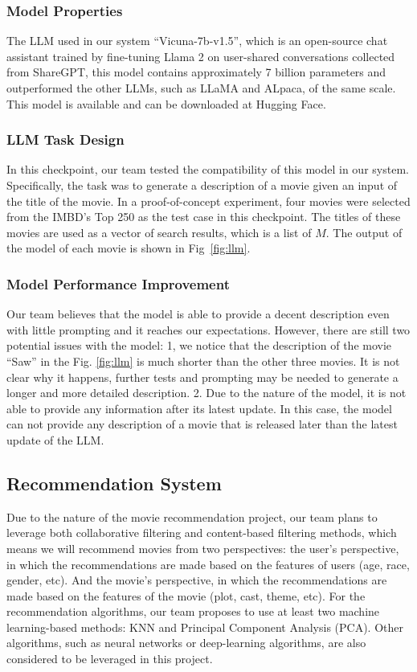 \documentclass[journal]{IEEEtran}
\theoremstyle{mydefstyle}
\begin{document}
\subsubsection{Model Properties}
The LLM used in our system “Vicuna-7b-v1.5”, which is an open-source chat assistant trained by fine-tuning Llama 2 on user-shared conversations collected from ShareGPT, this model contains approximately 7 billion parameters and outperformed the other LLMs, such as LLaMA and ALpaca, of the same scale\cite{zheng2023judging}. This model is available and can be downloaded at Hugging Face.  

\subsubsection{LLM Task Design}
In this checkpoint, our team tested the compatibility of this model in our system. Specifically, the task was to generate a description of a movie given an input of the title of the movie. In a proof-of-concept experiment, four movies were selected from the IMBD's Top 250 as the test case in this checkpoint\cite{IMDbhot250}. The titles of these movies are used as a vector of search results, which is a list of \(M\). The output of the model of each movie is shown in Fig~\ref{fig:llm}. 


\subsubsection{Model Performance Improvement}
Our team believes that the model is able to provide a decent description even with little prompting and it reaches our expectations. However, there are still two potential issues with the model: 1, we notice that the description of the movie “Saw” in the Fig. \ref{fig:llm} is much shorter than the other three movies. It is not clear why it happens, further tests and prompting may be needed to generate a longer and more detailed description. 2. Due to the nature of the model, it is not able to provide any information after its latest update. In this case, the model can not provide any description of a movie that is released later than the latest update of the LLM. 

\subsection{Recommendation System}
Due to the nature of the movie recommendation project,  our team plans to leverage both collaborative filtering and content-based filtering methods, which means we will recommend movies from two perspectives: the user's perspective, in which the recommendations are made based on the features of users (age, race, gender, etc). And the movie’s perspective, in which the recommendations are made based on the features of the movie (plot, cast, theme, etc). For the recommendation algorithms, our team proposes to use at least two machine learning-based methods: KNN and Principal Component Analysis (PCA). Other algorithms, such as neural networks or deep-learning algorithms, are also considered to be leveraged in this project.
\end{document}
